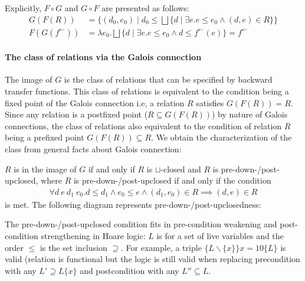 \documentclass{llncs}
\newcommand{\fb}{{f^{\leftarrow}}}
\newcommand{\join}{\sqcup}
\newcommand{\bigjoin}{\bigsqcup}
\newcommand{\comp}{\circ}
\newcommand{\rotleq}{\rotatebox[origin=c]{90}{$\leq$}}
\begin{document}
  Explicitly, $F \comp G$ and $G \comp F$ are presented as follows:
  \begin{align*}
    G(F(R)) &= \{ (d_{0},e_{0}) \mid d_{0} \leq \bigjoin \{ d \mid \exists e.e \leq e_{0} \land (d,e) \in R \}\} \\
    F(G(\fb)) &= \lambda e_{0} . \bigjoin \{ d \mid \exists e. e \leq e_{0} \land d \leq \fb(e) \} = \fb
  \end{align*}

\paragraph{The class of relations via the Galois connection}
  The image of $G$ is the class of relations that can be specified by backward transfer functions.
  This class of relations is equivalent to the condition being a fixed point of the Galois connection i.e, a relation $R$ satisfies $G(F(R)) = R$. Since any relation is a postfixed point ($R \subseteq G(F(R))$) by nature of Galois connections, the class of relations also equivalent to the condition of relation $R$ being a prefixed point $G(F(R)) \subseteq R$.
  We obtain the characterization of the class from general facts about Galois connection:
  \begin{proposition}\label{prop:predown-postup}
  $R$ is in the image of $G$ if and only if $R$ is $\join$-closed and $R$ is pre-down-/post-upclosed,
  where $R$ is pre-down-/post-upclosed if and only if the condition
  \begin{align*}
  \forall d\ e\ d_{1 }\ e_{0}. d \leq d_{1} \land e_{0} \leq e \land (d_{1}, e_{0}) \in R \implies (d, e) \in R
  \end{align*}
  is met.
  The following diagram represents pre-down-/post-upclosedness:
  \begin{center}
  \end{center}
  \end{proposition}


  \begin{example}
    The pre-down-/post-upclosed condition fits in pre-condition weakening and post-condition strengthening in Hoare logic: $L$ is for a set of live variables and the order $\leq$ is the set inclusion $\supseteq$.
    For example, a triple $\{ L \backslash \{ x \} \} x = 10 \{ L \}$ is valid (relation is functional but the logic is still valid when replacing precondition with any $L' \supseteq L \{ x \}$ and postcondition with any $L'' \subseteq L$.
  \end{example}
\end{document}
